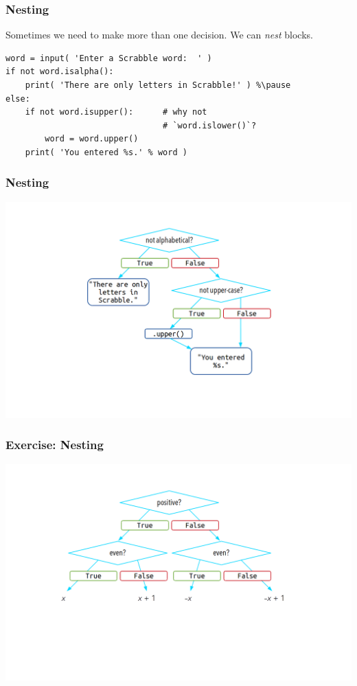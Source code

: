 \documentclass[11pt]{beamer}
\begin{document}
\begin{frame}[fragile]
  \frametitle{Nesting}
  \Enlarge

  \begin{itemize}
  \myitem  Sometimes we need to make more than one decision. %
  \myitem  We can \emph{nest} blocks. %
    \begin{Verbatim}
word = input( 'Enter a Scrabble word:  ' )
if not word.isalpha():
    print( 'There are only letters in Scrabble!' ) %\pause
else:
    if not word.isupper():      # why not
                                # `word.islower()`?
        word = word.upper()
    print( 'You entered %s.' % word )
    \end{Verbatim}
  \end{itemize}
\end{frame}

\begin{frame}
  \frametitle{Nesting}
  \includegraphics[width=\textwidth]{./img/control-flow-nesting-else.png}
\end{frame}

\begin{frame}
  \frametitle{Exercise:  Nesting}
  \includegraphics[width=\textwidth]{./img/control-flow-nesting-else-ex.png}
\end{frame}
\end{document}
